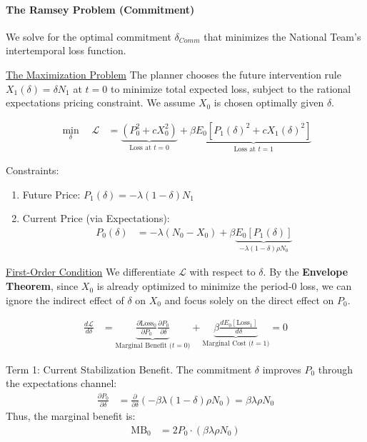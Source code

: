 \documentclass[12pt]{article}
\begin{document}
\paragraph{The Ramsey Problem (Commitment)}

We solve for the optimal commitment $\delta_{Comm}$ that minimizes the National Team's intertemporal loss function.

\underline{The Maximization Problem}
The planner chooses the future intervention rule $X_1(\delta) = \delta N_1$ at $t=0$ to minimize total expected loss, subject to the rational expectations pricing constraint. We assume $X_0$ is chosen optimally given $\delta$.

\begin{align}
    \min_{\delta} \quad \mathcal{L} &= \underbrace{(P_0^2 + c X_0^2)}_{\text{Loss at } t=0} + \beta \underbrace{E_0[ P_1(\delta)^2 + c X_1(\delta)^2 ]}_{\text{Loss at } t=1}
\end{align}

\noindent Constraints:
\begin{enumerate}
    \item Future Price: $P_1(\delta) = -\lambda (1-\delta) N_1$
    \item Current Price (via Expectations):
    \begin{align}
        P_0(\delta) &= -\lambda (N_0 - X_0) + \beta \underbrace{E_0[ P_1(\delta) ]}_{-\lambda (1-\delta) \rho N_0}
    \end{align}
\end{enumerate}

\underline{First-Order Condition} We differentiate $\mathcal{L}$ with respect to $\delta$. By the \textbf{Envelope Theorem}, since $X_0$ is already optimized to minimize the period-0 loss, we can ignore the indirect effect of $\delta$ on $X_0$ and focus solely on the direct effect on $P_0$.

\begin{align}
    \frac{d \mathcal{L}}{d \delta} &= \underbrace{\frac{\partial \text{Loss}_0}{\partial P_0} \frac{\partial P_0}{\partial \delta}}_{\text{Marginal Benefit ($t=0$)}} + \underbrace{\beta \frac{d E_0[\text{Loss}_1]}{d \delta}}_{\text{Marginal Cost ($t=1$)}} = 0
\end{align}

\noindent Term 1: Current Stabilization Benefit. The commitment $\delta$ improves $P_0$ through the expectations channel:
\begin{align}
    \frac{\partial P_0}{\partial \delta} &= \frac{\partial}{\partial \delta} \left( -\beta \lambda (1-\delta) \rho N_0 \right) = \beta \lambda \rho N_0
\end{align}
Thus, the marginal benefit is:
\begin{align}
    \text{MB}_0 &= 2 P_0 \cdot (\beta \lambda \rho N_0)
\end{align}
\end{document}
